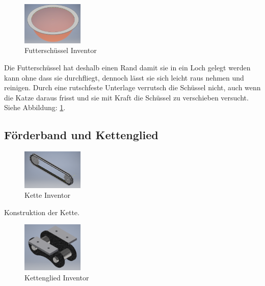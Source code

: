 \begin{figure}
\vspace{-20pt}
  \begin{center}
    \includegraphics[width=0.26\textwidth]{Bilder/Inventor/Schuessel}
  \end{center}
  \caption{Futterschüssel Inventor}
  \label{Futterschuessel_Inventor}
  \vspace{-10pt}
\end{figure}

Die Futterschüssel hat deshalb einen Rand damit sie in ein Loch gelegt werden kann ohne dass sie durchfliegt, dennoch lässt sie sich leicht raus nehmen und reinigen. Durch eine rutschfeste Unterlage verrutsch die Schüssel nicht, auch wenn die Katze daraus frisst und sie mit Kraft die Schüssel zu verschieben versucht. Siehe Abbildung: \ref{Futterschuessel_Inventor}.

\subsection{Förderband und Kettenglied}

\begin{figure}
\vspace{-20pt}
  \begin{center}
    \includegraphics[width=0.26\textwidth]{Bilder/Inventor/Kette}
  \end{center}
  \caption{Kette Inventor}
  \label{Kette_Inventor}
  \vspace{-10pt}
\end{figure}

Konstruktion der Kette.

\begin{figure}
\vspace{-20pt}
  \begin{center}
    \includegraphics[width=0.26\textwidth]{Bilder/Inventor/Kettenglied}
  \end{center}
  \caption{Kettenglied Inventor}
  \label{Kettenglied_Inventor}
  \vspace{-10pt}
\end{figure}

